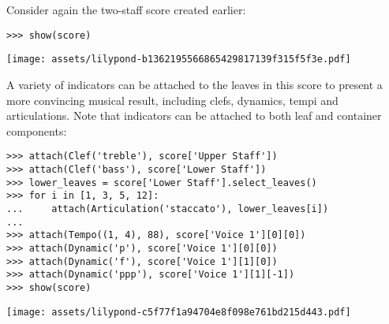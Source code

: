 \noindent Consider again the two-staff score created earlier:

\begin{comment}
<abjad>
show(score)
</abjad>
\end{comment}

\begin{abjadbookoutput}
\begin{singlespacing}
\vspace{-0.5\baselineskip}
\begin{lstlisting}
>>> show(score)
\end{lstlisting}
\noindent\texttt{[image: assets/lilypond-b1362195566865429817139f315f5f3e.pdf]}
\end{singlespacing}
\end{abjadbookoutput}

\noindent A variety of indicators can be attached to the leaves in this score
to present a more convincing musical result, including clefs, dynamics, tempi
and articulations. Note that indicators can be attached to both leaf and
container components:

\begin{comment}
<abjad>
attach(Clef('treble'), score['Upper Staff'])
attach(Clef('bass'), score['Lower Staff'])
lower_leaves = score['Lower Staff'].select_leaves()
for i in [1, 3, 5, 12]:
    attach(Articulation('staccato'), lower_leaves[i])

attach(Tempo((1, 4), 88), score['Voice 1'][0][0])
attach(Dynamic('p'), score['Voice 1'][0][0])
attach(Dynamic('f'), score['Voice 1'][1][0])
attach(Dynamic('ppp'), score['Voice 1'][1][-1])
show(score)
</abjad>
\end{comment}

\begin{abjadbookoutput}
\begin{singlespacing}
\vspace{-0.5\baselineskip}
\begin{lstlisting}
>>> attach(Clef('treble'), score['Upper Staff'])
>>> attach(Clef('bass'), score['Lower Staff'])
>>> lower_leaves = score['Lower Staff'].select_leaves()
>>> for i in [1, 3, 5, 12]:
...     attach(Articulation('staccato'), lower_leaves[i])
...
>>> attach(Tempo((1, 4), 88), score['Voice 1'][0][0])
>>> attach(Dynamic('p'), score['Voice 1'][0][0])
>>> attach(Dynamic('f'), score['Voice 1'][1][0])
>>> attach(Dynamic('ppp'), score['Voice 1'][1][-1])
>>> show(score)
\end{lstlisting}
\noindent\texttt{[image: assets/lilypond-c5f77f1a94704e8f098e761bd215d443.pdf]}
\end{singlespacing}
\end{abjadbookoutput}

